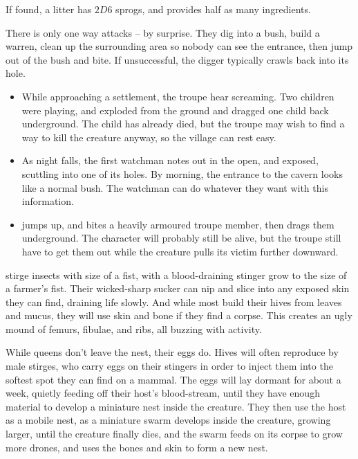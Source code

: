 \begin{multicols}{2}
If found, a litter has $2D6$ sprogs, and provides half as many \glspl{ingredient}.

\showEnc
There is only one way  attacks -- by surprise.  They dig into a bush, build a warren, clean up the surrounding area so nobody can see the entrance, then jump out of the bush and bite.  If unsuccessful, the \gls{digger} typically crawls back into its hole.

\begin{itemize}
  \item
  While approaching a settlement, the troupe hear screaming.
  Two children were playing, and  exploded from the ground and dragged one child back underground.
  The child has already died, but the troupe may wish to find a way to kill the creature anyway, so the \gls{village} can rest easy.
  \item
  As night falls, the first watchman notes  out in the open, and exposed, scuttling into one of its holes.
  By morning, the entrance to the cavern looks like a normal bush.
  The watchman can do whatever they want with this information.
  \item
   jumps up, and bites a heavily armoured troupe member, then drags them underground.
  The character will probably still be alive, but the troupe still have to get them out while the creature pulls its victim further downward.

\end{itemize}

\mouthdigger

  {stirge}%
  {insects with size of a fist, with a blood-draining stinger}%
grow to the size of a farmer's fist.
Their wicked-sharp sucker can nip and slice into any exposed skin they can find, draining life slowly.
And while most build their hives from leaves and mucus, they will use skin and bone if they find a corpse.
This creates an ugly mound of femurs, fibulae, and ribs, all buzzing with activity.

While queens don't leave the nest, their eggs do.
Hives will often reproduce by male stirges, who carry eggs on their stingers in order to inject them into the softest spot they can find on a mammal.
The eggs will lay dormant for about a week, quietly feeding off their host's blood-stream, until they have enough material to develop a miniature nest inside the creature.
They then use the host as a mobile nest, as a miniature swarm develops inside the creature, growing larger, until the creature finally dies, and the swarm feeds on its corpse to grow more drones, and uses the bones and skin to form a new nest.


\end{multicols}
